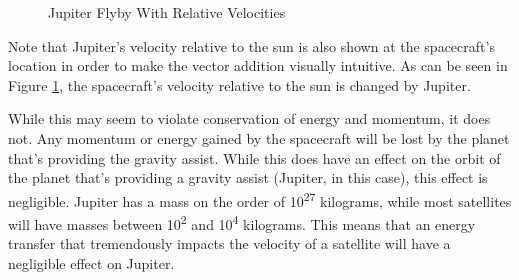 \documentclass{article}
\begin{document}
\begin{figure}[H]
    \centering
    \caption{Jupiter Flyby With Relative Velocities}\label{fig:Jupiter Flyby Rel Velocities}
\end{figure}

Note that Jupiter's velocity relative to the sun is also shown at the spacecraft's location in order to make the vector addition visually intuitive. As can be seen in Figure \ref{fig:Jupiter Flyby Rel Velocities}, the spacecraft's velocity relative to the sun is changed by Jupiter.

While this may seem to violate conservation of energy and momentum, it does not. Any momentum or energy gained by the spacecraft will be lost by the planet that's providing the gravity assist. While this does have an effect on the orbit of the planet that's providing a gravity assist (Jupiter, in this case), this effect is negligible. Jupiter has a mass on the order of 10\textsuperscript{27} kilograms, while most satellites will have masses between 10\textsuperscript{2} and 10\textsuperscript{4} kilograms. This means that an energy transfer that tremendously impacts the velocity of a satellite will have a negligible effect on Jupiter.
\end{document}

